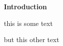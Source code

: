 \doublespacing
\noindent
{\fontsize{14}{16}\selectfont \textbf{Introduction}\\} 
\sloppy

    this is some text
    
    but this other text
\fussy
